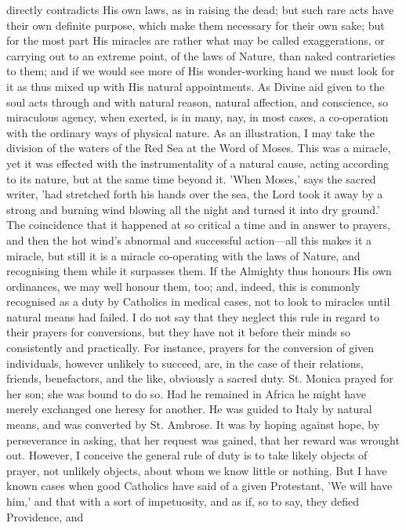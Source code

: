 directly contradicts His own laws, as in raising the dead; but such
rare acts have their own definite purpose, which make them necessary
for their own sake; but for the most part His miracles are rather what
may be called exaggerations, or carrying out to an extreme point, of
the laws of Nature, than naked contrarieties to them; and if we would
see more of His wonder-working hand we must look for it as thus mixed
up with His natural appointments. As Divine aid given to the soul acts
through and with natural reason, natural affection, and conscience, so
miraculous agency, when exerted, is in many, nay, in most cases, a
co-operation with the ordinary ways of physical nature. As an
illustration, I may take the division of the waters of the Red Sea at
the Word of Moses. This was a miracle, yet it was effected with the
instrumentality of a natural cause, acting according to its nature,
but at the same time beyond it. 'When Moses,' says the sacred writer,
'had stretched forth his hands over the sea, the Lord took it away by
a strong and burning wind blowing all the night and turned it into dry
ground.' The coincidence that it happened at so critical a time and in
answer to prayers, and then the hot wind’s abnormal and successful
action—all this makes it a miracle, but still it is a miracle
co-operating with the laws of Nature, and recognising them while it
surpasses them. If the Almighty thus honours His own ordinances, we
may well honour them, too; and, indeed, this is commonly recognised as
a duty by Catholics in medical cases, not to look to miracles until
natural means had failed. I do not say that they neglect this rule in
regard to their prayers for conversions, but they have not it before
their minds so consistently and practically. For instance, prayers for
the conversion of given individuals, however unlikely to succeed, are,
in the case of their relations, friends, benefactors, and the like,
obviously a sacred duty. St. Monica prayed for her son; she was bound
to do so. Had he remained in Africa he might have merely exchanged one
heresy for another. He was guided to Italy by natural means, and was
converted by St. Ambrose. It was by hoping against hope, by
perseverance in asking, that her request was gained, that her reward
was wrought out. However, I conceive the general rule of duty is to
take likely objects of prayer, not unlikely objects, about whom we
know little or nothing. But I have known cases when good Catholics
have said of a given Protestant, 'We will have him,' and that with a
sort of impetuosity, and as if, so to say, they defied Providence, and
